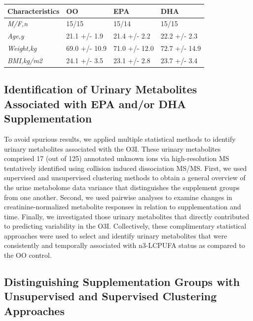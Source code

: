 \documentclass[journal=jacsat,manuscript=article]{achemso}
\begin{document}
\begin{longtable}[]{@{}llll@{}}
\toprule\noalign{}
\textbf{Characteristics} & \textbf{OO} & \textbf{EPA} & \textbf{DHA} \\
\midrule\noalign{}
\endhead
\bottomrule\noalign{}
\endlastfoot
\emph{M/F,n} & 15/15 & 15/14 & 15/15 \\
\emph{Age,y} & 21.1 +/- 1.9 & 21.4 +/- 2.2 & 22.2 +/- 2.3 \\
\emph{Weight,kg} & 69.0 +/- 10.9 & 71.0 +/- 12.0 & 72.7 +/- 14.9 \\
\emph{BMI,kg/m2} & 24.1 +/- 3.5 & 23.1 +/- 2.8 & 23.7 +/- 3.4 \\
\end{longtable}

\subsection{Identification of Urinary Metabolites Associated with EPA
and/or DHA
Supplementation}\label{identification-of-urinary-metabolites-associated-with-epa-andor-dha-supplementation}

To avoid spurious results, we applied multiple statistical methods to
identify urinary metabolites associated with the O3I. These urinary
metabolites comprised 17 (out of 125) annotated unknown ions via
high-resolution MS tentatively identified using collision induced
dissociation MS/MS. First, we used supervised and unsupervised
clustering methods to obtain a general overview of the urine metabolome
data variance that distinguishes the supplement groups from one another.
Second, we used pairwise analyses to examine changes in
creatinine-normalized metabolite responses in relation to
supplementation and time. Finally, we investigated those urinary
metabolites that directly contributed to predicting variability in the
O3I. Collectively, these complimentary statistical approaches were used
to select and identify urinary metabolites that were consistently and
temporally associated with n3-LCPUFA status as compared to the OO
control.

\subsection{Distinguishing Supplementation Groups with Unsupervised and
Supervised Clustering
Approaches}\label{distinguishing-supplementation-groups-with-unsupervised-and-supervised-clustering-approaches}
\end{document}
